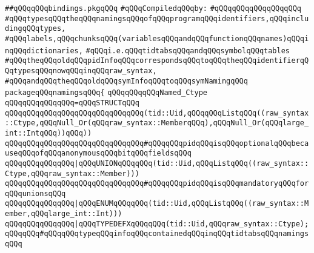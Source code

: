 \label{src/lib/c-kit/src/ast/bindings.pkg}
\verb|##qQQqqQQqbindings.pkgqQQq|\newline
\newline
\verb|#qQQqCompiledqQQqby:|\newline
\verb|#qQQqqQQqqQQqqQQqqQQq|\newline
\newline
\verb|#qQQqtypesqQQqtheqQQqnamingsqQQqofqQQqprogramqQQqidentifiers,qQQqincludingqQQqtypes,|\newline
\verb|#qQQqlabels,qQQqchunksqQQq(variablesqQQqandqQQqfunctionqQQqnames)qQQqinqQQqdictionaries,|\newline
\verb|#qQQqi.e.qQQqtidtabsqQQqandqQQqsymbolqQQqtables|\newline
\newline
\verb|#qQQqtheqQQqoldqQQqpidInfoqQQqcorrespondsqQQqtoqQQqtheqQQqidentifierqQQqtypesqQQqnowqQQqinqQQqraw_syntax,|\newline
\verb|#qQQqandqQQqtheqQQqoldqQQqsymInfoqQQqtoqQQqsymNamingqQQq|\newline
\newline
\verb|packageqQQqnamingsqQQq{|\newline
\newline
\verb|qQQqqQQqqQQqNamed_Ctype|\newline
\verb|qQQqqQQqqQQqqQQq=qQQqSTRUCTqQQq|\newline
\verb|qQQqqQQqqQQqqQQqqQQqqQQqqQQqqQQq(tid::Uid,qQQqqQQqListqQQq((raw_syntax::Ctype,qQQqNull_Or(qQQqraw_syntax::MemberqQQq),qQQqNull_Or(qQQqlarge_int::IntqQQq))qQQq))|\newline
\verb|qQQqqQQqqQQqqQQqqQQqqQQqqQQqqQQq#qQQqqQQqpidqQQqisqQQqoptionalqQQqbecauseqQQqofqQQqanonymousqQQqbitqQQqfieldsqQQq|\newline
\verb|qQQqqQQqqQQqqQQq|\verb#|qQQqUNIONqQQqqQQq(tid::Uid,qQQqListqQQq((raw_syntax::Ctype,qQQqraw_syntax::Member)))#\newline
\verb|qQQqqQQqqQQqqQQqqQQqqQQqqQQqqQQq#qQQqqQQqpidqQQqisqQQqmandatoryqQQqforqQQqunionsqQQq|\newline
\verb|qQQqqQQqqQQqqQQq|\verb#|qQQqENUMqQQqqQQq(tid::Uid,qQQqListqQQq((raw_syntax::Member,qQQqlarge_int::Int)))#\newline
\verb|qQQqqQQqqQQqqQQq|\verb#|qQQqTYPEDEFXqQQqqQQq(tid::Uid,qQQqraw_syntax::Ctype);#\newline
\newline
\verb|qQQqqQQq#qQQqqQQqtypeqQQqinfoqQQqcontainedqQQqinqQQqtidtabsqQQqnamingsqQQq|\newline
